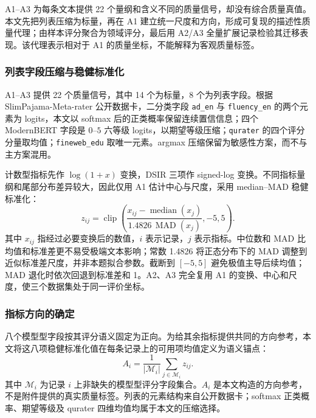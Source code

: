 A1--A3 为每条文本提供 22 个量纲和含义不同的质量信号，却没有综合质量真值。本文先把列表压缩为标量，再在 A1 建立统一尺度和方向，形成可复现的描述性质量代理；由样本评分聚合为领域评分，最后用 A2/A3 全量扩展记录检验其迁移表现。该代理表示相对于 A1 的质量坐标，不能解释为客观质量标签。

\subsubsection{列表字段压缩与稳健标准化}

A1--A3 提供 22 个质量信号，其中 14 个为标量，8 个为列表字段。根据 SlimPajama-Meta-rater 公开数据卡\cite{metaraterdata}，二分类字段 \texttt{ad\_en} 与 \texttt{fluency\_en} 的两个元素为 logits，本文以 softmax 后的正类概率保留连续置信信息；四个 ModernBERT 字段是 $0$--$5$ 六等级 logits，以期望等级压缩；\texttt{qurater} 的四个评分分量取均值；\texttt{fineweb\_edu} 取唯一元素。argmax 压缩保留为敏感性方案，而不与主方案混用。

计数型指标先作 $\log(1+x)$ 变换，DSIR 三项作 signed-log 变换。不同指标量纲和尾部分布差异较大，因此仅用 A1 估计中心与尺度，采用 median--MAD 稳健标准化：
\begin{equation}
z_{ij}
=
\operatorname{clip}\!\left(
\frac{x_{ij}-\operatorname{median}(x_j)}
{1.4826\,\operatorname{MAD}(x_j)},
-5,5
\right).
\label{eq:q1_robust_z}
\end{equation}
其中 $x_{ij}$ 指经过必要变换后的数值，$i$ 表示记录，$j$ 表示指标。中位数和 MAD 比均值和标准差更不易受极端文本影响；常数 1.4826 将正态分布下的 MAD 调整到近似标准差尺度，并非本题拟合参数。截断到 $[-5,5]$ 避免极值主导后续均值；MAD 退化时依次回退到标准差和 1。A2、A3 完全复用 A1 的变换、中心和尺度，使三个数据集处于同一评价坐标。

\subsubsection{指标方向的确定}

八个模型型字段按其评分语义固定为正向。为给其余指标提供共同的方向参考，本文将这八项稳健标准化值在每条记录上的可用项均值定义为语义锚点：
\begin{equation}
A_i=\frac{1}{|\mathcal M_i|}\sum_{j\in\mathcal M_i}z_{ij}.
\label{eq:q1_quality_anchor}
\end{equation}
其中 $\mathcal M_i$ 为记录 $i$ 上非缺失的模型型评分字段集合。$A_i$ 是本文构造的方向参考，不是附件提供的真实质量标签。列表的元素结构来自公开数据卡；softmax 正类概率、期望等级及 qurater 四维均值均属于本文的压缩选择。

